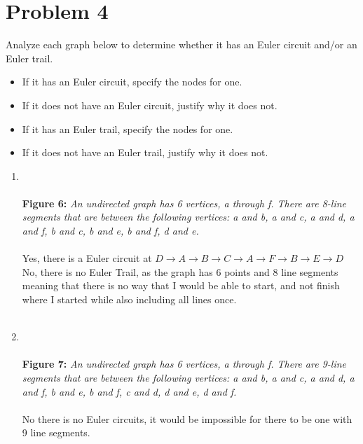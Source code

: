   \section*{Problem 4}
 Analyze each graph below to determine whether it has an Euler circuit and/or an Euler trail.
 \begin{itemize}
     \item If it has an Euler circuit, specify the nodes for one.
     \item If it does not have an Euler circuit, justify why it does not.
     \item If it has an Euler trail, specify the nodes for one.
     \item If it does not have an Euler trail, justify why it does not.
 \end{itemize}
  \begin{enumerate}[label=(\alph*)]
\item 
{}
\\\\
{\color{blue} {\bf Figure 6:} \emph{An undirected graph has 6 vertices, a through f. There are 8-line segments that are between the following vertices: a and b, a and c, a and d, a and f, b and c, b and e, b and f, d and e. 
  }
}\\\\
  Yes, there is a Euler circuit at $D \to A \to B \to C \to A \to F \to B \to E \to D$
  \\
  
  No, there is no Euler Trail, as the graph has 6 points and 8 line segments meaning that there is no way that I would be able to start, and not finish where I started while also including all lines once.
\\\\
   \newpage
\item
{}
\\\\
{\color{blue} {\bf Figure 7:} \emph{
An undirected graph has 6 vertices, a through f. There are 9-line segments that are between the following vertices: a and b, a and c, a and d, a and f, b and e, b and f, c and d, d and e, d and f. }
}
\\\\
  No there is no Euler circuits, it would be impossible for there to be one with 9 line segments. \\
  

\end{enumerate}
